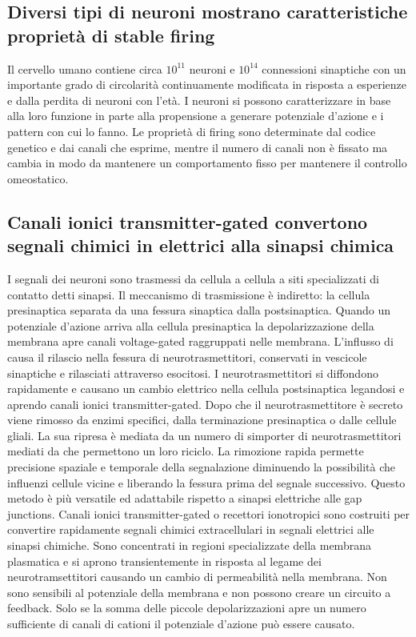 \subsection{Diversi tipi di neuroni mostrano caratteristiche propriet\`a di stable firing}
Il cervello umano contiene circa $10^{11}$ neuroni e $10^{14}$ connessioni sinaptiche con un importante grado di circolarit\`a continuamente modificata in risposta a esperienze e dalla
perdita di neuroni con l'et\`a. I neuroni si possono caratterizzare in base alla loro funzione in parte alla propensione a generare potenziale d'azione e i pattern con cui lo fanno. 
Le propriet\`a di firing sono determinate dal codice genetico e dai canali che esprime, mentre il numero di canali non \`e fissato ma cambia in modo da mantenere un comportamento fisso
per mantenere il controllo omeostatico. 
\subsection{Canali ionici transmitter-gated convertono segnali chimici in elettrici alla sinapsi chimica}
I segnali dei neuroni sono trasmessi da cellula a cellula a siti specializzati di contatto detti sinapsi. Il meccanismo di trasmissione \`e indiretto: la cellula presinaptica separata
da una fessura sinaptica dalla postsinaptica. Quando un potenziale d'azione arriva alla cellula presinaptica la depolarizzazione della membrana apre canali voltage-gated 
raggruppati nelle membrana. L'influsso di  causa il rilascio nella fessura di neurotrasmettitori, conservati in vescicole sinaptiche e rilasciati attraverso esocitosi. I
neurotrasmettitori si diffondono rapidamente e causano un cambio elettrico nella cellula postsinaptica legandosi e aprendo canali ionici transmitter-gated. Dopo che il neurotrasmettitore
\`e secreto viene rimosso da enzimi specifici, dalla terminazione presinaptica o dalle cellule gliali. La sua ripresa \`e mediata da un numero di simporter di neurotrasmettitori mediati
da  che permettono un loro riciclo. La rimozione rapida permette precisione spaziale e temporale della segnalazione diminuendo la possibilit\`a che influenzi cellule vicine e
liberando la fessura prima del segnale successivo. Questo metodo \`e pi\`u versatile ed adattabile rispetto a sinapsi elettriche alle gap junctions. Canali ionici transmitter-gated o 
recettori ionotropici sono costruiti per convertire rapidamente segnali chimici extracellulari in segnali elettrici alle sinapsi chimiche. Sono concentrati in regioni specializzate
della membrana plasmatica e si aprono transientemente in risposta al legame dei neurotramsettitori causando un cambio di permeabilit\`a nella membrana. Non sono sensibili al potenziale
della membrana e non possono creare un circuito a feedback. Solo se la somma delle piccole depolarizzazioni apre un numero sufficiente di canali di cationi il potenziale d'azione pu\`o
essere causato.
